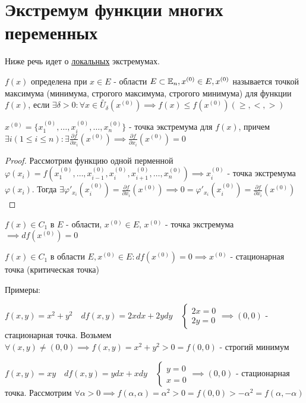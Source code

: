 \documentclass[../main.tex]{subfiles}
\begin{document}
\section{Экстремум функции многих переменных} 
Ниже речь идет о \underline{локальных} экстремумах.
\begin{definition}
    $f(x)$ определена при $x\in E$ - области $E\subset \mathbb{E}_{n}, x^{(0)}\in E, x^{(0)}$ называется точкой максимума (минимума, строгого максимума, строгого минимума) для функции $f(x)$, если $\exists \delta > 0 : \forall x \in \overset{\circ}{U}_{\delta}(x^{(0)}) \implies f(x) \leqslant f(x^{(0)}) \left( \geqslant, <, > \right)$
\end{definition}
\begin{theorem}
    $x^{(0)} = \{x_{1}^{(0)},\dots,x_{i}^{(0)},\dots,x_{n}^{(0)}\}$ - точка экстремума для $f(x)$, причем $\exists i (1\leqslant i \leqslant n): \exists \frac{\partial{f}}{\partial{x_{i}}}(x^{(0)})\implies \frac{\partial{f}}{\partial{x_{i}}}(x^{(0)})=0$
\end{theorem}
\begin{proof}
    Рассмотрим функцию одной перменной $\varphi(x_{i}) = f(x_{1}^{(0)},\dots,x_{i-1}^{(0)},x_{i}^{(0)},x_{i+1}^{(0)},\dots,x_{n}^{(0)})\implies x_{i}^{(0)}$ - точка экстремума $\varphi(x_{i})$. Тогда $\exists \varphi'_{x_{i}}(x_{i}^{(0)}) = \frac{\partial{f}}{\partial{x_{i}}}(x^{(0)})\implies 0 = \varphi'_{x_{i}}(x_{i}^{(0)}) = \frac{\partial{f}}{\partial{x_{i}}} (x^{(0)})$
\end{proof}
\begin{corollary}
    $f(x)\in C_{1}$ в $E$ - области, $x^{(0)}\in E$, $x^{(0)}$ - точка экстремума $\implies df(x^{(0)})=0$
\end{corollary}
\begin{definition}
    $f(x)\in C_{1}$ в области $E, x^{(0)}\in E: df(x^{(0)})=0\implies x^{(0)}$ - стационарная точка (критическая точка)
\end{definition}
Примеры:

\noindent $f(x,y)=x^{2}+y^{2}\quad df(x,y) = 2xdx +2ydy\quad \begin{cases}
    2x=0 \\ 
    2y=0 
\end{cases}\implies (0,0)$ - стационарная точка. Возьмем  $\forall (x,y)\neq (0,0) \implies f(x,y)=  x^{2}+y^{2}>0=f(0,0)$ - строгий минимум

\noindent $f(x,y)=xy \quad df(x,y)=ydx+xdy\quad \begin{cases}
    y=0 \\ 
    x= 0 
\end{cases} \implies (0,0)$ - стационарная точка. Рассмотрим $\forall \alpha>0 \implies f(\alpha,\alpha) = \alpha^{2}>0 = f(0,0)> -\alpha^{2} = f(\alpha,-\alpha)$
\end{document}
